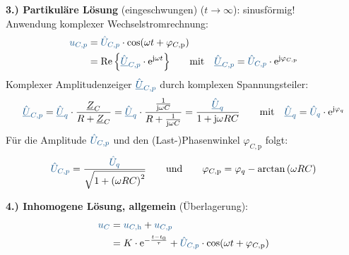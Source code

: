 {\begin{frame}[t]%
    \textbf{3.) Partikuläre Lösung} (eingeschwungen) ($t \to \infty$): sinusförmig!\\[2pt]
    Anwendung komplexer Wechselstromrechnung:
    \begin{align*}
        \ecv{u_{C,p}}
            &= \ecv{\hat{U}_{C,p}} \cdot \cos(\omega t + \varphi_{C,\mathrm{p}})\\
            &= \Re{\left\{ \ecv{\hat{\underline{U}}_{C,p}} \cdot \mathrm{e}^{\mathrm{j} \omega t} \right\}} \qquad \text{mit}\quad \ecv{\hat{\underline{U}}_{C,p}} = \ecv{\hat{U}_{C,p}} \cdot \mathrm{e}^{\mathrm{j} \varphi_{C,\mathrm{p}}}
    \end{align*}
    Komplexer Amplitudenzeiger $\ecv{\hat{\underline{U}}_{C,p}}$ durch komplexen Spannungsteiler:
    \begin{equation*}
        \ecv{\hat{\underline{U}}_{C,p}}
            = \ecv{\hat{\underline{U}}_q} \cdot \frac{\underline{Z}_C}{R + \underline{Z}_C}
            = \ecv{\hat{\underline{U}}_q} \cdot \frac{\frac{1}{\mathrm{j}\omega C}}{R + \frac{1}{\mathrm{j} \omega C}} %
            = \frac{\ecv{\hat{\underline{U}}_q}}{1 + \mathrm{j} \omega R C}
            \qquad \text{mit}\quad \ecv{\hat{\underline{U}}_q} = \ecv{\hat{U}_q} \cdot \mathrm{e}^{\mathrm{j} \varphi_q}
    \end{equation*}
    Für die Amplitude $\ecv{\hat{U}_{C,p}}$ und den (Last-)Phasenwinkel $\varphi_{C,\mathrm{p}}$ folgt:
    \begin{align*}
        \ecv{\hat{U}_{C,p}} = \frac{\ecv{\hat{U}_q}}{\sqrt{1 + \left(\omega RC\right)^2}} \qquad\text{und}\qquad
        \varphi_{C,\mathrm{p}} = \varphi_q - \arctan\left(\omega RC\right) %
    \end{align*}
\end{frame}

\begin{frame}[t]%
    \textbf{4.) Inhomogene Lösung, allgemein} (Überlagerung):
    \begin{align*}
        \ecv{u_C} &= \ecv{u_{C,\mathrm{h}}} + \ecv{u_{C,p}} \\
            &= K \cdot \mathrm{e}^{-\frac{t-t_0}{\tau}} + \ecv{\hat{U}_{C,p}} \cdot \cos(\omega t + \varphi_{C,\mathrm{p}}) %
    \end{align*}


\end{frame}}
